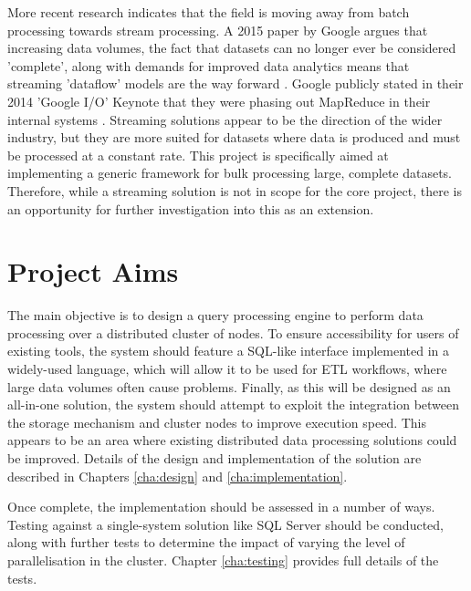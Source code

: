 More recent research indicates that the field is moving away from batch processing towards stream processing. A 2015 paper by Google argues that increasing data volumes, the fact that datasets can no longer ever be considered 'complete', along with demands for improved data analytics means that streaming 'dataflow' models are the way forward  \cite{akidau2015dataflow}. Google publicly stated in their 2014 'Google I/O' Keynote that they were phasing out MapReduce in their internal systems \cite{googleio2014}. 
Streaming solutions appear to be the direction of the wider industry, but they are more suited for datasets where data is produced and must be processed at a constant rate. This project is specifically aimed at implementing a generic framework for bulk processing large, complete datasets. Therefore, while a streaming solution is not in scope for the core project, there is an opportunity for further investigation into this as an extension.

\section{Project Aims}
The main objective is to design a query processing engine to perform data processing over a distributed cluster of nodes. To ensure accessibility for users of existing tools, the system should feature a SQL-like interface implemented in a widely-used language, which will allow it to be used for ETL workflows, where large data volumes often cause problems. Finally, as this will be designed as an all-in-one solution, the system should attempt to exploit the integration between the storage mechanism and cluster nodes to improve execution speed. This appears to be an area where existing distributed data processing solutions could be improved. Details of the design and implementation of the solution are described in Chapters \ref{cha:design} and \ref{cha:implementation}.

Once complete, the implementation should be assessed in a number of ways. Testing against a single-system solution like SQL Server should be conducted, along with further tests to determine the impact of varying the level of parallelisation in the cluster. Chapter \ref{cha:testing} provides full details of the tests.

